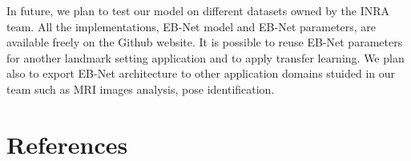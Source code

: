 \documentclass[review]{elsarticle}
\begin{document}
In future, we plan to test our model on different datasets owned by the INRA team. All the implementations, EB-Net model and EB-Net parameters, are available freely on the Github website. It is possible to reuse EB-Net parameters for another landmark setting application and to apply transfer learning. We plan also to export EB-Net architecture to other application domains stuided in our team such as MRI images analysis, pose identification.





\section*{References}


\end{document}
